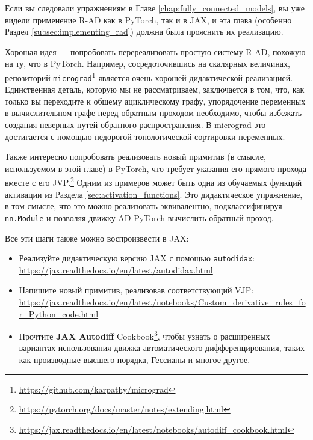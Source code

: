 Если вы следовали упражнениям в Главе \ref{chap:fully_connected_models}, вы уже видели применение R-AD как в PyTorch, так и в JAX, и эта глава (особенно Раздел \ref{subsec:implementing_rad}) должна была прояснить их реализацию.

Хорошая идея — попробовать перереализовать простую систему R-AD, похожую на ту, что в PyTorch. Например, сосредоточившись на скалярных величинах, репозиторий \texttt{micrograd}\footnote{\url{https://github.com/karpathy/micrograd}} является очень хорошей дидактической реализацией. Единственная деталь, которую мы не рассматриваем, заключается в том, что, как только вы переходите к общему ациклическому графу, упорядочение переменных в вычислительном графе перед обратным проходом необходимо, чтобы избежать создания неверных путей обратного распространения. В micrograd это достигается с помощью недорогой топологической сортировки переменных.

Также интересно попробовать реализовать новый примитив (в смысле, используемом в этой главе) в PyTorch, что требует указания его прямого прохода вместе с его JVP.\footnote{\url{https://pytorch.org/docs/master/notes/extending.html}}
Одним из примеров может быть одна из обучаемых функций активации из Раздела \ref{sec:activation_functions}. Это дидактическое упражнение, в том смысле, что это можно реализовать эквивалентно, подклассифицируя \texttt{nn.Module} и позволяя движку AD PyTorch вычислить обратный проход.

Все эти шаги также можно воспроизвести в JAX:
\begin{itemize}
\item Реализуйте дидактическую версию JAX с помощью \texttt{autodidax}: \url{https://jax.readthedocs.io/en/latest/autodidax.html}
\item Напишите новый примитив, реализовав соответствующий VJP: \url{https://jax.readthedocs.io/en/latest/notebooks/Custom_derivative_rules_for_Python_code.html}
\item Прочтите \textbf{JAX Autodiff} Cookbook\footnote{\url{https://jax.readthedocs.io/en/latest/notebooks/autodiff_cookbook.html}}, чтобы узнать о расширенных вариантах использования движка автоматического дифференцирования, таких как производные высшего порядка, Гессианы и многое другое. 
\end{itemize}